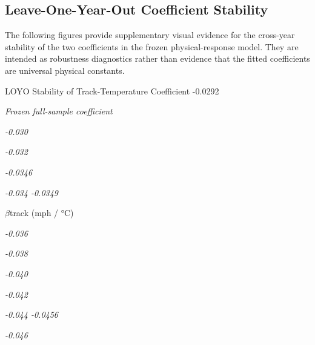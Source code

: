 \subsection{Leave-One-Year-Out Coefficient Stability}
The following figures provide supplementary visual evidence for the cross-year stability of the two coefficients in the frozen physical-response model. They are intended as robustness diagnostics rather than evidence that the fitted coefficients are universal physical constants.

LOYO Stability of Track-Temperature Coefficient -0.0292

\begin{center}\textit{Frozen full-sample coefficient}\end{center}

\begin{center}\textit{-0.030}\end{center}

\begin{center}\textit{-0.032}\end{center}

\begin{center}\textit{-0.0346}\end{center}

\begin{center}\textit{-0.034 -0.0349}\end{center}

\ensuremath{\beta}track (mph / °C)

\begin{center}\textit{-0.036}\end{center}

\begin{center}\textit{-0.038}\end{center}

\begin{center}\textit{-0.040}\end{center}

\begin{center}\textit{-0.042}\end{center}

\begin{center}\textit{-0.044                                                                     -0.0456}\end{center}

\begin{center}\textit{-0.046}\end{center}


